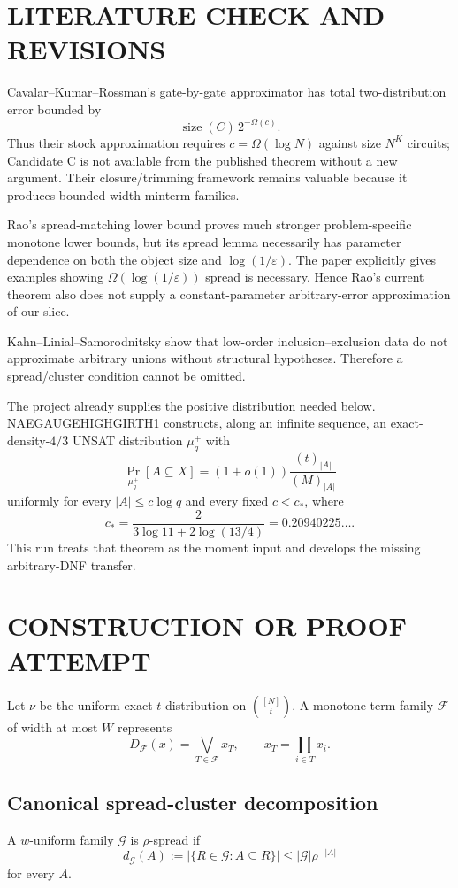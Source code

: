 \documentclass[11pt]{article}
\begin{document}
\section{LITERATURE CHECK AND REVISIONS}
Cavalar--Kumar--Rossman's gate-by-gate approximator has total two-distribution error bounded by
\[
\operatorname{size}(C)\,2^{-\Omega(c)}.
\]
Thus their stock approximation requires $c=\Omega(\log N)$ against size $N^K$ circuits; Candidate C is not available from the published theorem without a new argument. Their closure/trimming framework remains valuable because it produces bounded-width minterm families.

Rao's spread-matching lower bound proves much stronger problem-specific monotone lower bounds, but its spread lemma necessarily has parameter dependence on both the object size and $\log(1/\varepsilon)$. The paper explicitly gives examples showing $\Omega(\log(1/\varepsilon))$ spread is necessary. Hence Rao's current theorem also does not supply a constant-parameter arbitrary-error approximation of our slice.

Kahn--Linial--Samorodnitsky show that low-order inclusion--exclusion data do not approximate arbitrary unions without structural hypotheses. Therefore a spread/cluster condition cannot be omitted.

The project already supplies the positive distribution needed below. NAEGAUGEHIGHGIRTH1 constructs, along an infinite sequence, an exact-density-$4/3$ UNSAT distribution $\mu_q^+$ with
\[
\Pr_{\mu_q^+}[A\subseteq X]=(1+o(1))\frac{(t)_{|A|}}{(M)_{|A|}}
\]
uniformly for every $|A|\le c\log q$ and every fixed $c<c_*$, where
\[
c_*=\frac{2}{3\log11+2\log(13/4)}=0.20940225\ldots.
\]
This run treats that theorem as the moment input and develops the missing arbitrary-DNF transfer.

\section{CONSTRUCTION OR PROOF ATTEMPT}
Let $\nu$ be the uniform exact-$t$ distribution on $\binom{[N]}t$. A monotone term family $\mathcal F$ of width at most $W$ represents
\[
D_{\mathcal F}(x)=\bigvee_{T\in\mathcal F}x_T,\qquad x_T=\prod_{i\in T}x_i.
\]

\subsection{Canonical spread-cluster decomposition}
A $w$-uniform family $\mathcal G$ is $\rho$-spread if
\[
d_{\mathcal G}(A):=|\{R\in\mathcal G:A\subseteq R\}|
\le |\mathcal G|\rho^{-|A|}
\]
for every $A$.
\end{document}
